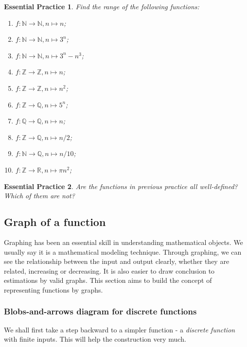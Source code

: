 \documentclass[12pt]{article}
\newtheorem{exercise}{Essential Practice}[subsubsection]
\begin{document}
    \begin{exercise}
        Find the range of the following functions:\begin{enumerate}
            \item $f:\mathbb{N}\to\mathbb{N}, n\mapsto n$;
            \item $f:\mathbb{N}\to\mathbb{N}, n\mapsto 3^n$;
            \item $f:\mathbb{N}\to\mathbb{N}, n\mapsto 3^n-n^3$;
            \item $f:\mathbb{Z}\to\mathbb{Z}, n\mapsto n$;
            \item $f:\mathbb{Z}\to\mathbb{Z}, n\mapsto n^2$;
            \item $f:\mathbb{Z}\to\mathbb{Q}, n\mapsto 5^n$;
            \item $f:\mathbb{Q}\to\mathbb{Q}, n\mapsto n$;
            \item $f:\mathbb{Z}\to\mathbb{Q}, n\mapsto n/2$;
            \item $f:\mathbb{N}\to\mathbb{Q}, n\mapsto n/10$;
            \item $f:\mathbb{Z}\to\mathbb{R}, n\mapsto \pi n^2$;
        \end{enumerate}
    \end{exercise}

    \begin{exercise}
        Are the functions in previous practice all well-defined? Which of them are not?
    \end{exercise}

    \subsection{Graph of a function}

    Graphing has been an essential skill in understanding mathematical objects. We usually say it is a mathematical modeling technique. Through graphing, we can see the relationship between the input and output clearly, whether they are related, increasing or decreasing. It is also easier to draw conclusion to estimations by valid graphs. This section aims to build the concept of representing functions by graphs.

    \subsubsection{Blobs-and-arrows diagram for discrete functions}

    We shall first take a step backward to a simpler function - a \textit{discrete function} with finite inputs. This will help the construction very much.
\end{document}
